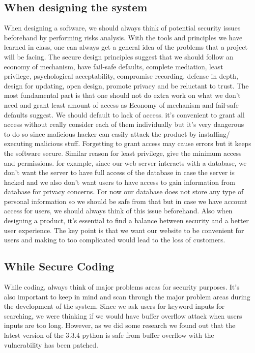 \documentclass[12pt, a4paper]{article}
\begin{document}
\subsection{When designing the system}
When designing a software, we should always think of potential security issues beforehand by performing risks analysis. With the tools and principles we have learned in class, one can always get a general idea of the problems that a project will be facing. The secure design principles suggest that we should follow an economy of mechanism, have fail-safe defaults, complete mediation, least privilege, psychological acceptability, compromise recording, defense in depth, design for updating, open design, promote privacy and be reluctant to trust. The most fundamental part is that one should not do extra work on what we don’t need and grant least amount of access as Economy of mechanism and fail-safe defaults suggest. We should default to lack of access. it’s convenient to grant all access without really consider each of them individually but it’s very dangerous to do so since malicious hacker can easily attack the product by installing/ executing malicious stuff. Forgetting to grant access may cause errors but it keeps the software secure. Similar reason for least privilege, give the minimum access and permissions. for example, since our web server interacts with a database, we don’t want the server to have full access of the database in case the server is hacked and we also don’t want users to have access to gain information from database for privacy concerns. For now our database does not store any type of personal information so we should be safe from that but in case we have account access for users, we should always think of this issue beforehand. Also when designing a product, it’s essential to find a balance between security and a better user experience. The key point is that we want our website to be convenient for users and making to too complicated would lead to the loss of customers.
\subsection{While Secure Coding}
While coding, always think of major problems areas for security purposes. It’s also important to keep in mind and scan through the major problem areas during the development of the system. Since we ask users for keyword inputs for searching, we were thinking if we would have buffer overflow attack when users inputs are too long. However, as we did some research we found out that the latest version of the 3.3.4 python is safe from buffer overflow with the vulnerability has been patched.
\end{document}
